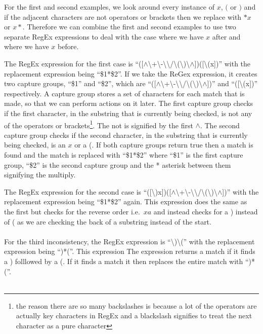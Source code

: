 \documentclass{article}
\begin{document}
For the first and second examples, we look around every instance of $x$, $($ or $)$ and if the adjacent characters are not operators or brackets then we replace with $*x$ or $x*$. Therefore we can combine the first and second examples to use two separate RegEx expressions to deal with the case where we have $x$ after and where we have $x$ before.\par
The RegEx expression for the first case is
``([$\wedge$\textbackslash+\textbackslash-\textbackslash*\textbackslash/\textbackslash(\textbackslash)\textbackslash$\wedge$])([\textbackslash(x])''
with the replacement expression being ``\$1*\$2''. If we take the ReGex expression, it creates two capture groups, ``\$1'' and ``\$2'', which are ``([$\wedge$\textbackslash+\textbackslash-\textbackslash*\textbackslash/\textbackslash(\textbackslash)\textbackslash$\wedge$])'' and ``([\textbackslash(x])'' respectively. A capture group stores a set of characters for each match that is made, so that we can perform actions on it later. The first capture group checks if the first character, in the substring that is currently being checked, is not any of the operators or brackets\footnote{the reason there are so many backslashes is because a lot of the operators are actually key characters in RegEx and a blackslash signifies to treat the next character as a pure character}. The not is signified by the first $\wedge$. The second capture group checks if the second character, in the substring that is currently being checked, is an $x$ or a (. If both capture groups return true then a match is found and the match is replaced with ``\$1*\$2'' where ``\$1'' is the first capture group, ``\$2'' is the second capture group and the * asterisk between them signifying the multiply.\par
The RegEx expression for the second case is
``([\textbackslash)x])([$\wedge$\textbackslash+\textbackslash-\textbackslash*\textbackslash/\textbackslash(\textbackslash)\textbackslash$\wedge$])''
with the replacement expression being ``\$1*\$2'' again. This expression does the same as the first but checks for the reverse order i.e.\ $xa$ and instead checks for a ) instead of ( as we are checking the back of a substring instead of the start.\\ \\
For the third inconsistency, the RegEx expression is
``\textbackslash)\textbackslash(''
with the replacement expression being ``)*(''. This expression The expression returns a match if it finds a ) folllowed by a (. If it finds a match it then replaces the entire match with ``)*(''.\\ \\
\end{document}
